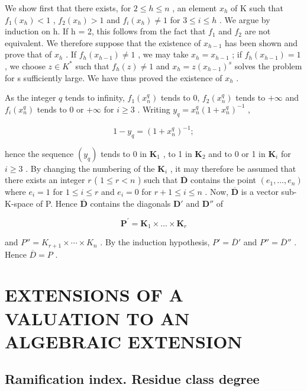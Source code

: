 We show first that there exists, for \(2 \leqslant h \leqslant n\) , an element \(x_{h}\) of K such that \(f_{1}(x_{h}) < 1\) , \(f_{2}(x_{h}) > 1\) and \(f_{i}(x_{h}) \neq 1\) for \(3 \leqslant i \leqslant h\) . We argue by induction on h. If h = 2, this follows from the fact that \(f_{1}\) and \(f_{2}\) are not equivalent. We therefore suppose that the existence of \(x_{h-1}\) has been shown and prove that of \(x_{h}\) . If \(f_{h}(x_{h-1}) \neq 1\) , we may take \(x_{h} = x_{h-1}\) ; if \(f_{h}(x_{h-1}) = 1\) , we choose \(z \in K^{*}\) such that \(f_{h}(z) \neq 1\) and \(x_{h} = z(x_{h-1})^{s}\) solves the problem for s sufficiently large. We have thus proved the existence of \(x_{h}\) .

As the integer \(q\) tends to infinity, \(f_{1}(x_{n}^{q})\) tends to 0, \(f_{2}(x_{n}^{q})\) tends to \(+\infty\) and \(f_{i}(x_{n}^{q})\) tends to 0 or \(+\infty\) for \(i \geqslant 3\) . Writing \(y_{q} = x_{n}^{q}(1 + x_{n}^{q})^{-1}\) ,

\[
1 - y _ {q} = (1 + x _ {n} ^ {q}) ^ {- 1};
\]

hence the sequence \((y_q)\) tends to 0 in \(\mathbf{K}_1\) , to 1 in \(\mathbf{K}_2\) and to 0 or 1 in \(\mathbf{K}_i\) for \(i \geqslant 3\) . By changing the numbering of the \(\mathbf{K}_i\) , it may therefore be assumed that there exists an integer \(r\) ( \(1 \leqslant r < n\) ) such that \(\overline{\mathbf{D}}\) contains the point \((e_1, \ldots, e_n)\) where \(e_i = 1\) for \(1 \leqslant i \leqslant r\) and \(e_i = 0\) for \(r + 1 \leqslant i \leqslant n\) . Now, \(\overline{\mathbf{D}}\) is a vector sub-K-space of P. Hence \(\overline{\mathbf{D}}\) contains the diagonals \(\mathbf{D}'\) and \(\mathbf{D}''\) of

\[
\mathbf {P} ^ {\prime} = \mathbf {K} _ {1} \times \dots \times \mathbf {K} _ {r}
\]

and \(P'' = K_{r+1} \times \cdots \times K_n\) . By the induction hypothesis, \(P' = \overline{D}'\) and \(P'' = \overline{D}''\) . Hence \(\overline{D} = P\) .

\section{EXTENSIONS OF A VALUATION TO AN ALGEBRAIC EXTENSION}

\subsection{Ramification index. Residue class degree}

